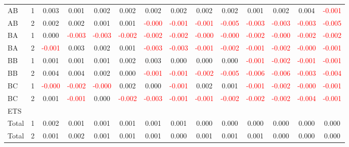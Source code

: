 \begin{table}[!htb]
{\begin{tabular}{llcccccccccccc}
AB & 1 & 0.003 & 0.001 & 0.002 & 0.002 & 0.002 & 0.002 & 0.002 & 0.002 & 0.001 & 0.002 & 0.004 & \textcolor{red}{-0.001}\\
AB & 2 & 0.002 & 0.002 & 0.001 & 0.001 & \textcolor{red}{-0.000} & \textcolor{red}{-0.001} & \textcolor{red}{-0.001} & \textcolor{red}{-0.005} & \textcolor{red}{-0.003} & \textcolor{red}{-0.003} & \textcolor{red}{-0.003} & \textcolor{red}{-0.005}\\
BA & 1 & 0.000 & \textcolor{red}{-0.003} & \textcolor{red}{-0.003} & \textcolor{red}{-0.002} & \textcolor{red}{-0.002} & \textcolor{red}{-0.002} & \textcolor{red}{-0.000} & \textcolor{red}{-0.000} & \textcolor{red}{-0.002} & \textcolor{red}{-0.000} & \textcolor{red}{-0.002} & \textcolor{red}{-0.002}\\
BA & 2 & \textcolor{red}{-0.001} & 0.003 & 0.002 & 0.001 & \textcolor{red}{-0.003} & \textcolor{red}{-0.003} & \textcolor{red}{-0.001} & \textcolor{red}{-0.002} & \textcolor{red}{-0.001} & \textcolor{red}{-0.002} & \textcolor{red}{-0.000} & \textcolor{red}{-0.001}\\
BB & 1 & 0.001 & 0.001 & 0.001 & 0.002 & 0.003 & 0.000 & 0.000 & 0.000 & \textcolor{red}{-0.001} & \textcolor{red}{-0.002} & \textcolor{red}{-0.001} & \textcolor{red}{-0.001}\\
BB & 2 & 0.004 & 0.004 & 0.002 & 0.000 & \textcolor{red}{-0.001} & \textcolor{red}{-0.001} & \textcolor{red}{-0.002} & \textcolor{red}{-0.005} & \textcolor{red}{-0.006} & \textcolor{red}{-0.006} & \textcolor{red}{-0.003} & \textcolor{red}{-0.004}\\
BC & 1 & \textcolor{red}{-0.000} & \textcolor{red}{-0.002} & \textcolor{red}{-0.000} & 0.002 & 0.000 & \textcolor{red}{-0.001} & 0.002 & 0.001 & \textcolor{red}{-0.001} & \textcolor{red}{-0.002} & \textcolor{red}{-0.000} & \textcolor{red}{-0.001}\\
BC & 2 & 0.001 & \textcolor{red}{-0.001} & 0.000 & \textcolor{red}{-0.002} & \textcolor{red}{-0.003} & \textcolor{red}{-0.001} & \textcolor{red}{-0.001} & \textcolor{red}{-0.002} & \textcolor{red}{-0.002} & \textcolor{red}{-0.002} & \textcolor{red}{-0.004} & \textcolor{red}{-0.001}\\
\hline
ETS &  &  &  &  &  &  &  &  &  &  &  &  & \\
\hline
Total & 1 & 0.002 & 0.001 & 0.001 & 0.001 & 0.001 & 0.001 & 0.000 & 0.000 & 0.000 & 0.000 & 0.000 & 0.000\\
Total & 2 & 0.001 & 0.002 & 0.001 & 0.001 & 0.001 & 0.000 & 0.001 & 0.001 & 0.001 & 0.000 & 0.000 & 0.000\\

\end{tabular}}
\end{table}
